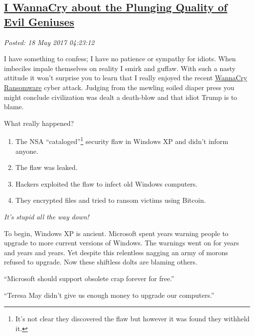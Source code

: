 %

\subsection*{\href{http://analyzethedatanotthedrivel.org/2017/05/17/i-wannacry-about-the-plunging-quality-of-evil-geniuses/}{I WannaCry about the Plunging Quality of Evil Geniuses}}


\noindent\emph{Posted: 18 May 2017 04:23:12}
\vspace{6pt}

I have something to confess; I have no patience or sympathy for idiots.
When imbeciles impale themselves on reality I smirk and guffaw. With
such a nasty attitude it won't surprise you to learn that I really
enjoyed the recent
\href{https://en.wikipedia.org/wiki/WannaCry_ransomware_attack}{WannaCry
Ransomware} cyber attack. Judging from the mewling soiled diaper press
you might conclude civilization was dealt a death-blow and that idiot
Trump is to blame.

What really happened?

\begin{enumerate}
\def\labelenumi{\arabic{enumi}.}
\item
  The NSA ``cataloged''\footnote{It's not clear
  they discovered the flaw but however it was found they withheld it.} %
  security flaw in Windows XP and didn't inform anyone.
\item
  The flaw was leaked.
\item
  Hackers exploited the flaw to infect old Windows computers.
\item
  They encrypted files and tried to ransom victims using Bitcoin.
\end{enumerate}

\emph{It's stupid all the way down!}

To begin, Windows XP is ancient. Microsoft spent years warning people to
upgrade to more current versions of Windows. The warnings went on for
years and years and years. Yet despite this relentless nagging an army
of morons refused to upgrade. Now these shiftless dolts are blaming
others.

``Microsoft should support obsolete crap forever for free.''

``Teresa May didn't give us enough money to upgrade our computers.''

